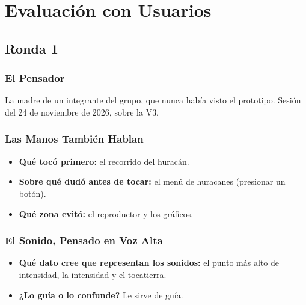 \documentclass[11pt,a4paper]{article}
\begin{document}
	\vspace{0.4cm}

	\section{Evaluación con Usuarios}


	\subsection{Ronda 1}

	\subsubsection{El Pensador}
	La madre de un integrante del grupo, que nunca había visto el prototipo. Sesión del 24 de noviembre de 2026, sobre la V3.

	\subsubsection{Las Manos También Hablan}
	\begin{itemize}
		\item \textbf{Qué tocó primero:} el recorrido del huracán.
		\item \textbf{Sobre qué dudó antes de tocar:} el menú de huracanes (presionar un botón).
		\item \textbf{Qué zona evitó:} el reproductor y los gráficos.
	\end{itemize}

	\subsubsection{El Sonido, Pensado en Voz Alta}
	\begin{itemize}
		\item \textbf{Qué dato cree que representan los sonidos:} el punto más alto de intensidad, la intensidad y el tocatierra.
		\item \textbf{¿Lo guía o lo confunde?} Le sirve de guía.
	\end{itemize}
\end{document}
